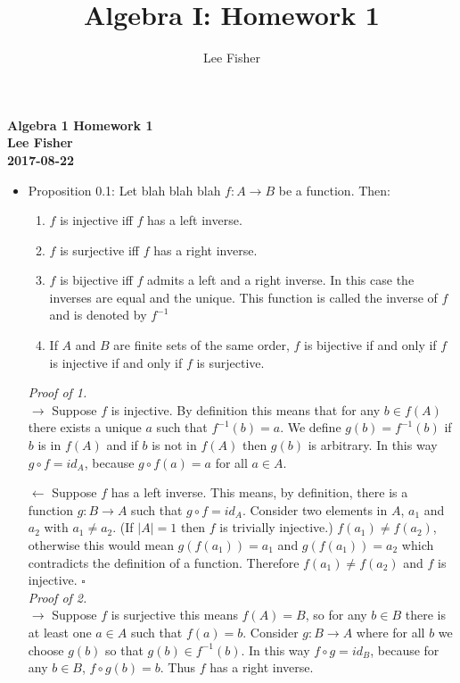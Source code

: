 \documentclass[12pt]{report}
\title{\textbf{Algebra I: Homework 1}}
\author{Lee Fisher}
\date{}
\begin{document}
\textbf{Algebra 1 Homework 1}\\
\indent \textbf{Lee Fisher}\\
\indent \textbf{2017-08-22}

\begin{itemize}
\item Proposition 0.1: Let blah blah blah $f:A \to B$ be a function. Then:
\begin{enumerate}
\item $f$ is injective iff $f$ has a left inverse.
\item $f$ is surjective iff $f$ has a right inverse.
\item $f$ is bijective iff $f$ admits a left and a right inverse. In this case the inverses are equal and the unique.
      This function is called the inverse of $f$ and is denoted by $f^{-1}$
\item If $A$ and $B$ are finite sets of the same order, $f$ is bijective if and only if $f$ is injective if and only if
      $f$ is surjective.
\end{enumerate}

\textit{Proof of 1.}\\
$\rightarrow$ Suppose $f$ is injective. By definition this means that for any $b \in f(A)$ there exists a unique $a$
              such that $f^{-1}(b) = a$. We define $g(b) = f^{-1}(b)$ if $b$ is in $f(A)$ and if $b$ is not in $f(A)$
              then $g(b)$ is arbitrary. In this way $g \circ f = id_A$, because $g \circ f(a) = a$ for all $a \in A$.

$\leftarrow$ Suppose $f$ has a left inverse. This means, by definition, there is a function $g:B \to A$ such that
             $g\circ f = id_A$. Consider two elements in $A$, $a_1$ and $a_2$ with $a_1 \neq a_2$. (If $|A|=1$ then $f$
             is trivially injective.) $f(a_1) \neq f(a_2)$, otherwise this would mean $g(f(a_1)) = a_1$ and
             $g(f(a_1)) = a_2$ which contradicts the definition of a function. Therefore $f(a_1) \neq f(a_2)$ and $f$ is
             injective. $\square$\\

\textit{Proof of 2.}\\
$\rightarrow$ Suppose $f$ is surjective this means $f(A) = B$, so for any $b \in B$ there is at least one $a \in A$ such
              that $f(a) = b$. Consider $g:B \to A$ where for all $b$ we choose $g(b)$ so that $g(b) \in f^{-1}(b)$. In
              this way $f \circ g = id_B$, because for any $b \in B$, $f \circ g(b) = b$. Thus $f$ has a right inverse.


\end{itemize}
\end{document}
